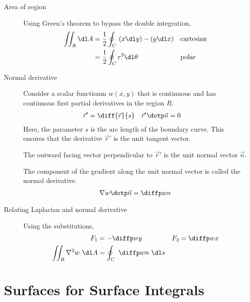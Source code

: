 \begin{description}
    \item[Area of region] Using Green's theorem to bypass the double integration,
        \begin{align}
            \iint_R \dl A & = \frac{1}{2} \oint_C \ (x \dl y) - (y \dl x) &
                          & \text{cartesian}                                \\
                          & = \frac{1}{2} \oint_C r^2 \dl \theta          &
                          & \text{polar}
        \end{align}

    \item[Normal derivative] Consider a scalar functionm $ w(x, y) $ that is continuous
        and has continuous first partial derivatives in the region $ R $.
        \begin{align}
            \vec{r}'               & = \diff {\vec{r}}{s} &
            \vec{r}' \dotp \vec{n} & = 0
        \end{align}
        Here, the parameter $ s $ is the arc length of the boundary curve. This ensures that
        the derivative $ \vec{r}' $ is the unit tangent vector. \par
        The outward facing vector perpendicular to $ \vec{r}' $ is the unit normal vector
        $ \vec{n} $. \par
        The component of the gradient along the unit normal vector is called the normal
        derivative.
        \begin{align}
            \nabla w \dotp \vec{n} = \diffp wn
        \end{align}

    \item[Relating Laplacian and normal derivative] Using the substitutions,
        \begin{align}
            F_1                       & = - \diffp wy               &
            F_2                       & = \diffp wx                   \\
            \iint_R \nabla^2 w\ \dl A & = \oint_C\ \diffp wn\ \dl s
        \end{align}
\end{description}

\section{Surfaces for Surface Integrals}

